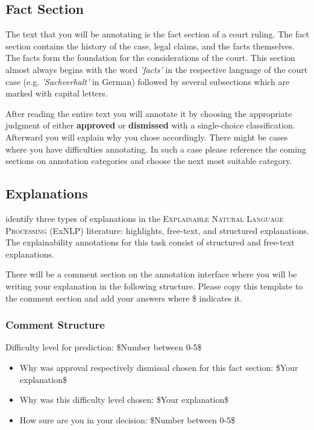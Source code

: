 \documentclass{article}
\begin{document}
\subsection{Fact Section}
The text that you will be annotating is the fact section of a court ruling. The fact section contains the history of the case, legal claims, and the facts themselves. The facts form the foundation for the considerations of the court. This section almost always begins with the word \emph{'facts'} in the respective language of the court case (e.g. \emph{'Sachverhalt'} in German) followed by several subsections which are marked with capital letters. 

After reading the entire text you will annotate it by choosing the appropriate judgment of either \textbf{approved} or \textbf{dismissed} with a single-choice classification. Afterward you will explain why you chose accordingly. There might be cases where you have difficulties annotating. In such a case please reference the coming sections on annotation categories and choose the next most suitable category.

\subsection{Explanations}
\cite{TMTE_2021} identify three types of explanations in the \textsc{Explainable Natural Language Processing} (ExNLP) literature: highlights, free-text, and structured explanations. The explainability annotations for this task consist of structured and free-text explanations. 

There will be a comment section on the annotation interface where you will be writing your explanation in the following structure. Please copy this template to the comment section and add your answers where \$ indicates it.

\subsubsection{Comment Structure}
\begin{mdframed}[frametitle={\$Annotators name\$}]
Difficulty level for prediction: \$Number between 0-5\$
\begin{itemize}
	\item Why was approval respectively dismissal chosen for this fact section: \$Your explanation\$
	\item Why was this difficulty level chosen: \$Your explanation\$
	\item How sure are you in your decision: \$Number between 0-5\$
\end{itemize}	
\end{mdframed}
\end{document}
